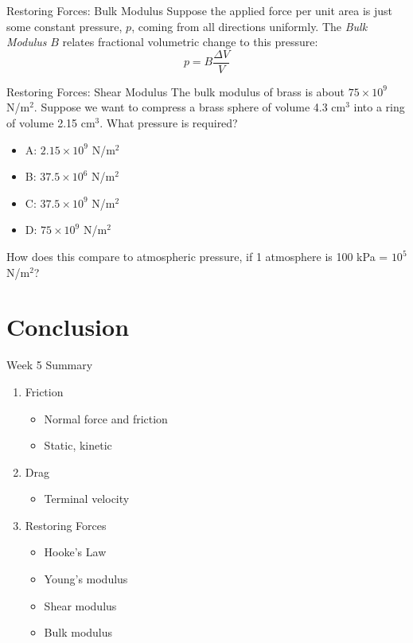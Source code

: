 \documentclass{beamer}
\begin{document}
\begin{frame}{Restoring Forces: Bulk Modulus}
Suppose the applied force per unit area is just some constant pressure, $p$, coming from all directions uniformly.  The \textit{Bulk Modulus} $B$ relates fractional volumetric change to this pressure: \\
\begin{equation}
p = B\frac{\Delta V}{V}
\end{equation}
\end{frame}

\begin{frame}{Restoring Forces: Shear Modulus}
The bulk modulus of brass is about $75 \times 10^{9}$ N/m$^2$.  Suppose we want to compress a brass sphere of volume 4.3 cm$^3$ into a ring of volume 2.15 cm$^3$.  What pressure is required?
\begin{itemize}
\item A: $2.15 \times 10^{9}$ N/m$^2$ 
\item B: $37.5 \times 10^{6}$ N/m$^2$ 
\item C: $37.5 \times 10^{9}$ N/m$^2$ 
\item D: $75 \times 10^{9}$ N/m$^2$ 
\end{itemize}
How does this compare to atmospheric pressure, if 1 atmosphere is 100 kPa = $10^5$ N/m$^2$?
\end{frame}

\section{Conclusion}

\begin{frame}{Week 5 Summary}
\begin{enumerate}
\item \alert{Friction}
\begin{itemize}
\item Normal force and friction
\item Static, kinetic
\end{itemize}
\item \alert{Drag}
\begin{itemize}
\item Terminal velocity
\end{itemize}
\item \alert{Restoring Forces}
\begin{itemize}
\item Hooke's Law
\item Young's modulus
\item Shear modulus
\item Bulk modulus
\end{itemize}
\end{enumerate}
\end{frame}
\end{document}

